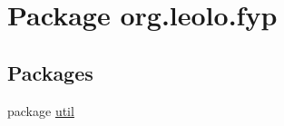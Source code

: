 \hypertarget{namespaceorg_1_1leolo_1_1fyp}{\section{Package org.\-leolo.\-fyp}
\label{namespaceorg_1_1leolo_1_1fyp}
}
\subsection*{Packages}
\begin{DoxyCompactItemize}
\item 
package \hyperlink{namespaceorg_1_1leolo_1_1fyp_1_1util}{util}
\end{DoxyCompactItemize}

